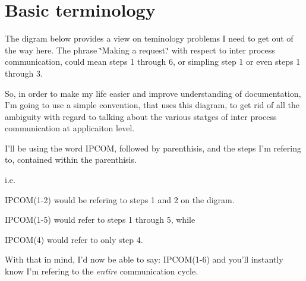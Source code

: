 \section*{Basic terminology}

The digram below provides a view on teminology problems I need to get out of the way here. The phrase \char`\"{}\-Making a request.\char`\"{} with respect to inter process communication, could mean steps 1 through 6, or simpling step 1 or even steps 1 through 3.

So, in order to make my life easier and improve understanding of documentation, I'm going to use a simple convention, that uses this diagram, to get rid of all the ambiguity with regard to talking about the various statges of inter process communication at applicaiton level.

I'll be using the word I\-P\-C\-O\-M, followed by parenthisis, and the steps I'm refering to, contained within the parenthisis.

i.\-e.


\begin{DoxyItemize}
\item I\-P\-C\-O\-M(1-\/2) would be refering to steps 1 and 2 on the digram.
\item I\-P\-C\-O\-M(1-\/5) would refer to steps 1 through 5, while
\item I\-P\-C\-O\-M(4) would refer to only step 4.
\end{DoxyItemize}

With that in mind, I'd now be able to say\-: I\-P\-C\-O\-M(1-\/6) and you'll instantly know I'm refering to the {\itshape entire} communication cycle.

 